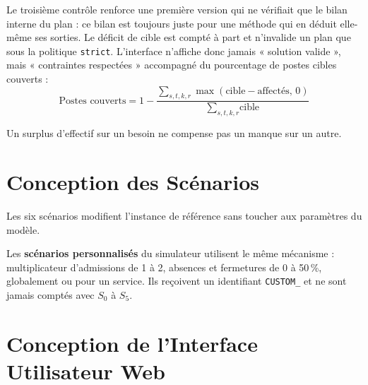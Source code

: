 Le troisième contrôle renforce une première version qui ne vérifiait que le bilan interne du plan : ce bilan est toujours juste pour une méthode qui en déduit elle-même ses sorties. Le déficit de cible est compté à part et n'invalide un plan que sous la politique \texttt{strict}. L'interface n'affiche donc jamais « solution valide », mais « contraintes respectées » accompagné du pourcentage de postes cibles couverts :
\begin{equation}
    \text{Postes couverts} = 1 - \frac{\sum_{s,t,k,r} \max(\text{cible} - \text{affectés},\, 0)}{\sum_{s,t,k,r} \text{cible}}
\end{equation}

Un surplus d'effectif sur un besoin ne compense pas un manque sur un autre.

\section{Conception des Scénarios}

Les six scénarios modifient l'instance de référence sans toucher aux paramètres du modèle.



Les \textbf{scénarios personnalisés} du simulateur utilisent le même mécanisme : multiplicateur d'admissions de 1 à 2, absences et fermetures de 0 à 50\,\%, globalement ou pour un service. Ils reçoivent un identifiant \texttt{CUSTOM\_} et ne sont jamais comptés avec $S_0$ à $S_5$.

\section{Conception de l'Interface Utilisateur Web}


